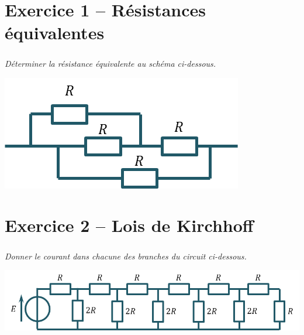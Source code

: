 \documentclass[10pt,fleqn]{book} %
\begin{document}

\vspace{7cm}
\pagestyle{fancy}
\thispagestyle{plain}


\def\columnseprulecolor{\color{ocre}}
\setlength{\columnseprule}{0.4pt} 
\begin{multicols}{2}

\section*{Exercice 1 -- Résistances équivalentes}

\subparagraph{}
\textit{Déterminer la résistance équivalente au schéma ci-dessous.}

\ifprof
\begin{corrige}

\end{corrige}
\else
\fi

\begin{center}
\includegraphics[width=.6\linewidth]{images/fig_01}
\end{center}

\section*{Exercice 2 -- Lois  de Kirchhoff}
\setcounter{subparagraph}{0}

\subparagraph{}
\textit{Donner le courant dans chacune des branches du circuit ci-dessous.}

\ifprof
\begin{corrige}

\end{corrige}
\else
\fi

\begin{center}
\includegraphics[width=\linewidth]{images/fig_02}
\end{center}


\end{multicols}
\end{document}
